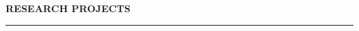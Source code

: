 \documentclass[10pt,letterpaper]{article}
\newenvironment{mysection}[1]{ %
  \medskip
  \MakeUppercase{\bf #1}
  \medskip
  \hrule
  \medskip
  \begin{list}{}{
      \setlength{\leftmargin}{1.5em}
    }
  \item[]
}{
  \end{list}
}
\begin{document}
\begin{mysection}{Research Projects}


\end{mysection}

\end{document}
